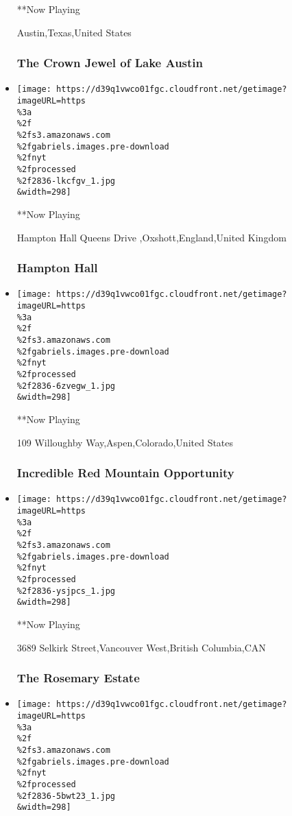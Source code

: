 \begin{itemize}
  **Now Playing

  Austin,Texas,United States

  \hypertarget{the-crown-jewel-of-lake-austin}{%
  \subsubsection{The Crown Jewel of Lake
  Austin}\label{the-crown-jewel-of-lake-austin}}
\item
  \texttt{[image: https://d39q1vwco01fgc.cloudfront.net/getimage?imageURL=https\\\%3a\\\%2f\\\%2fs3.amazonaws.com\\\%2fgabriels.images.pre-download\\\%2fnyt\\\%2fprocessed\\\%2f2836-lkcfgv\_1.jpg\\\&width=298]}

  **Now Playing

  Hampton Hall Queens Drive ,Oxshott,England,United Kingdom

  \hypertarget{hampton-hall}{%
  \subsubsection{Hampton Hall}\label{hampton-hall}}
\item
  \texttt{[image: https://d39q1vwco01fgc.cloudfront.net/getimage?imageURL=https\\\%3a\\\%2f\\\%2fs3.amazonaws.com\\\%2fgabriels.images.pre-download\\\%2fnyt\\\%2fprocessed\\\%2f2836-6zvegw\_1.jpg\\\&width=298]}

  **Now Playing

  109 Willoughby Way,Aspen,Colorado,United States

  \hypertarget{incredible-red-mountain-opportunity}{%
  \subsubsection{Incredible Red Mountain
  Opportunity}\label{incredible-red-mountain-opportunity}}
\item
  \texttt{[image: https://d39q1vwco01fgc.cloudfront.net/getimage?imageURL=https\\\%3a\\\%2f\\\%2fs3.amazonaws.com\\\%2fgabriels.images.pre-download\\\%2fnyt\\\%2fprocessed\\\%2f2836-ysjpcs\_1.jpg\\\&width=298]}

  **Now Playing

  3689 Selkirk Street,Vancouver West,British Columbia,CAN

  \hypertarget{the-rosemary-estate}{%
  \subsubsection{The Rosemary Estate}\label{the-rosemary-estate}}
\item
  \texttt{[image: https://d39q1vwco01fgc.cloudfront.net/getimage?imageURL=https\\\%3a\\\%2f\\\%2fs3.amazonaws.com\\\%2fgabriels.images.pre-download\\\%2fnyt\\\%2fprocessed\\\%2f2836-5bwt23\_1.jpg\\\&width=298]}


\end{itemize}
